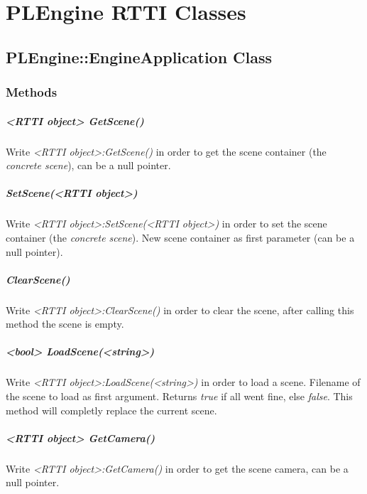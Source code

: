 \chapter{PLEngine RTTI Classes}




\section{PLEngine::EngineApplication Class}


\subsection{Methods}

\paragraph{<RTTI object> GetScene()}
Write \emph{<RTTI object>:GetScene()} in order to get the scene container (the \emph{concrete scene}), can be a null pointer.

\paragraph{SetScene(<RTTI object>)}
Write \emph{<RTTI object>:SetScene(<RTTI object>)} in order to set the scene container (the \emph{concrete scene}). New scene container as first parameter (can be a null pointer).

\paragraph{ClearScene()}
Write \emph{<RTTI object>:ClearScene()} in order to clear the scene, after calling this method the scene is empty.

\paragraph{<bool> LoadScene(<string>)}
Write \emph{<RTTI object>:LoadScene(<string>)} in order to load a scene. Filename of the scene to load as first argument. Returns \emph{true} if all went fine, else \emph{false}. This method will completly replace the current scene.

\paragraph{<RTTI object> GetCamera()}
Write \emph{<RTTI object>:GetCamera()} in order to get the scene camera, can be a null pointer.

